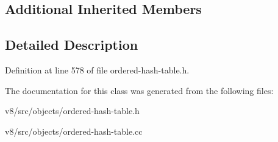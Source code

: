 \subsection*{Additional Inherited Members}


\subsection{Detailed Description}


Definition at line 578 of file ordered-\/hash-\/table.\+h.



The documentation for this class was generated from the following files\+:\begin{DoxyCompactItemize}
\item 
v8/src/objects/ordered-\/hash-\/table.\+h\item 
v8/src/objects/ordered-\/hash-\/table.\+cc\end{DoxyCompactItemize}
